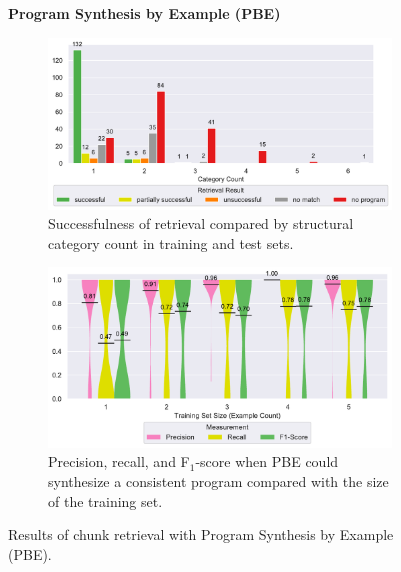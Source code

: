 \begin{figure}
\centering
    \textbf{Program Synthesis by Example (PBE)}\par\medskip
\begin{subfigure}[b]{\columnwidth}
		\centering
		\includegraphics[width=\columnwidth,
		clip]{img/big-study/failure-reason-categorycount-PBE.pdf}
				\caption{Successfulness of retrieval
				compared by structural category count
				in training and test sets.}
		\label{fig:failure-reason-categorycount-PBE}
\end{subfigure}\hspace{\fill}
\begin{subfigure}[b]{\columnwidth}
		\centering
		\includegraphics[width=\columnwidth,
		clip]{img/big-study/recall-precision-examplecount-sythesisworked-PBE.pdf}
				\caption{Precision, recall, and
				F$_{1}$-score when PBE could synthesize
				a consistent program compared with the
				size of the training set.}
		\label{fig:recall-precision-examplecount-sythesisworked-PBE}
\end{subfigure}
\caption{Results of chunk retrieval with Program Synthesis by Example
(PBE).}
\end{figure}

